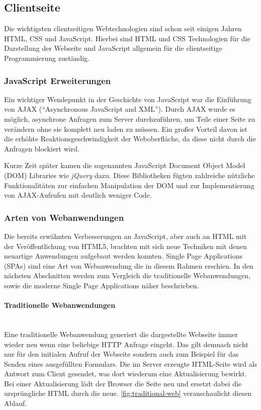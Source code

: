 \subsection{Clientseite}
Die wichtigsten clientseitigen Webtechnologien sind schon seit einigen Jahren HTML, CSS und JavaScript. Hierbei sind HTML und CSS Technologien für die Darstellung der Webseite und JavaScript allgemein für die clientseitige Programmierung zuständig\cite{Thattil2016}. 

\subsubsection{JavaScript Erweiterungen}
Ein wichtiger Wendepunkt in der Geschichte von JavaScript war die Einführung von \acs{AJAX} (\enquote{Asynchronous JavaScript and XML}). Durch AJAX wurde es möglich, asynchrone Anfragen zum Server durchzuführen, um Teile einer Seite zu verändern ohne sie komplett neu laden zu müssen. Ein großer Vorteil davon ist die erhöhte Reaktionsgeschwindigkeit der Weboberfläche, da diese nicht durch die Anfragen blockiert wird.

Kurze Zeit später kamen die sogenannten JavaScript Document Object Model (\acs{DOM}) Libraries wie \textit{jQuery} dazu. Diese Bibliotheken fügten zahlreiche nützliche Funktionalitäten zur einfachen Manipulation der DOM und zur Implementierung von AJAX-Aufrufen mit deutlich weniger Code\cite{Fink2014}.

\subsubsection{Arten von Webanwendungen}\label{web_types}
Die bereits erwähnten Verbesserungen an JavaScript, aber auch an HTML mit der Veröffentlichung von HTML5, brachten mit sich neue Techniken mit denen neuartige Anwendungen aufgebaut werden konnten. Single Page Applications (\acs{SPA}s) sind eine Art von Webanwendung die in diesem Rahmen erschien. In den nächsten Abschnitten werden zum Vergleich die traditionelle Webanwendungen, sowie die moderne Single Page Applications näher beschrieben.

\paragraph{Traditionelle Webanwendungen}$\;$ \\
Eine traditionelle Webanwendung generiert die dargestellte Webseite immer wieder neu wenn eine beliebige HTTP Anfrage eingeht. Das gilt demnach nicht nur für den initialen Aufruf der Webseite sondern auch zum Beispiel für das Senden eines ausgefüllten Formulars. Die im Server erzeugte HTML-Seite wird als Antwort zum Client gesendet, was dort wiederum eine Aktualisierung bewirkt. Bei einer Aktualisierung lädt der Browser die Seite neu und ersetzt dabei die ursprüngliche HTML durch die neue\cite{Fink2014}. \cref{fig:traditional-web} veranschaulicht diesen Ablauf.

